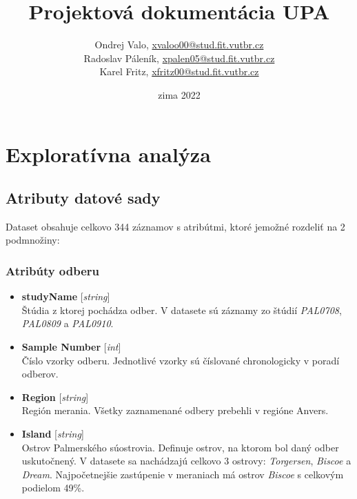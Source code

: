\documentclass[a4paper, 16pt]{article}
\author{Ondrej Valo, \href{mailto:xvaloo00@stud.fit.vutbr.cz}{xvaloo00@stud.fit.vutbr.cz}\\
Radoslav Páleník, \href{mailto:xpalen05@stud.fit.vutbr.cz}{xpalen05@stud.fit.vutbr.cz}\\
Karel Fritz, \href{mailto:xfritz00@stud.fit.vutbr.cz}{xfritz00@stud.fit.vutbr.cz}
}
\title{Projektová dokumentácia UPA }
\date{zima 2022}
\begin{document}
\maketitle

\section{Exploratívna analýza}

\subsection{Atributy datové sady}
Dataset obsahuje celkovo 344 záznamov s atribútmi, ktoré jemožné rozdeliť na 2 podmnožiny:

\subsubsection{Atribúty odberu}
\begin{itemize}
    \item \textbf{studyName} [\emph{string}]\\
    Štúdia z ktorej pochádza odber. V datasete sú záznamy zo štúdií \emph{PAL0708}, \emph{PAL0809} a \emph{PAL0910}.
    \item \textbf{Sample Number} [\emph{int}]\\
    Číslo vzorky odberu. Jednotlivé vzorky sú číslované chronologicky v poradí odberov.
   
    \item \textbf{Region} [\emph{string}]\\
    Región merania. Všetky zaznamenané odbery prebehli v regióne Anvers.
     
    \item \textbf{Island} [\emph{string}]\\
    Ostrov Palmerského súostrovia. Definuje ostrov, na ktorom bol daný odber uskutočnený. V datasete sa nachádzajú celkovo 3 ostrovy: \emph{Torgersen}, \emph{Biscoe} a \emph{Dream}. Najpočetnejšie zastúpenie v meraniach má ostrov \emph{Biscoe} s celkovým podielom 49\%.
\end{itemize}
\end{document}
